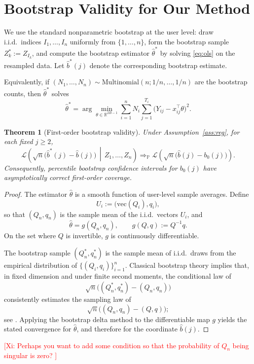 \documentclass[sigconf,anonymous,review]{acmart}
\newtheorem{theorem}{Theorem}[section]
\newcommand{\xg}[1]{\textcolor{red}{[Xi: #1]}}
\begin{document}
\section{Bootstrap Validity for Our Method}

We use the standard nonparametric bootstrap at the user level: draw i.i.d.\ indices $I_1,\dots,I_n$ uniformly from $\{1,\dots,n\}$, form the bootstrap sample $Z_k^*:=Z_{I_k}$, and compute the bootstrap estimator $\hat\theta^*$ by solving \eqref{eq:ols} on the resampled data. Let $\hat b^*(j)$ denote the corresponding bootstrap estimate.

Equivalently, if $(N_1,\dots,N_n)\sim\mathrm{Multinomial}(n;1/n,\dots,1/n)$ are the bootstrap counts, then $\hat\theta^*$ solves
\[
\hat\theta^*
=
\arg\min_{\theta\in\mathbb{R}^{2B-1}}
\sum_{i=1}^n N_i \sum_{j=1}^{T_i} \bigl(Y_{ij}-x_{ij}^\top\theta\bigr)^2.
\]

\begin{theorem}[First-order bootstrap validity]
\label{thm:boot}
Under Assumption~\ref{ass:reg}, for each fixed $j\ge 2$,
\[
\mathcal{L}\!\left(
\sqrt{n}\bigl(\hat b^*(j)-\hat b(j)\bigr)
\,\middle|\,
Z_1,\dots,Z_n
\right)
\Rightarrow_{\mathbb{P}}
\mathcal{L}\!\left(
\sqrt{n}\bigl(\hat b(j)-b_0(j)\bigr)
\right).
\]
Consequently, percentile bootstrap confidence intervals for $b_0(j)$ have asymptotically correct first-order coverage.
\end{theorem}

\begin{proof}
The estimator $\hat\theta$ is a smooth function of user-level sample averages. Define
\[
U_i:=\bigl(\mathrm{vec}(Q_i), q_i\bigr),
\]
so that $(Q_n,q_n)$ is the sample mean of the i.i.d.\ vectors $U_i$, and
\[
\hat\theta = g(Q_n,q_n),
\qquad
g(Q,q):=Q^{-1}q.
\]
On the set where $Q$ is invertible, $g$ is continuously differentiable.

The bootstrap sample $(Q_n^*,q_n^*)$ is the sample mean of i.i.d.\ draws from the empirical distribution of $\{(Q_i,q_i)\}_{i=1}^n$. Classical bootstrap theory implies that, in fixed dimension and under finite second moments, the conditional law of
\[
\sqrt{n}\bigl((Q_n^*,q_n^*)-(Q_n,q_n)\bigr)
\]
consistently estimates the sampling law of
\[
\sqrt{n}\bigl((Q_n,q_n)-(Q,q)\bigr);
\]
see \cite{Efron1979,vdV1998}. Applying the bootstrap delta method to the differentiable map $g$ yields the stated convergence for $\hat\theta$, and therefore for the coordinate $\hat b(j)$.
\end{proof}
\xg{Perhaps you want to add some condition so that the probability of $Q_n$ being singular is zero? }
\end{document}
